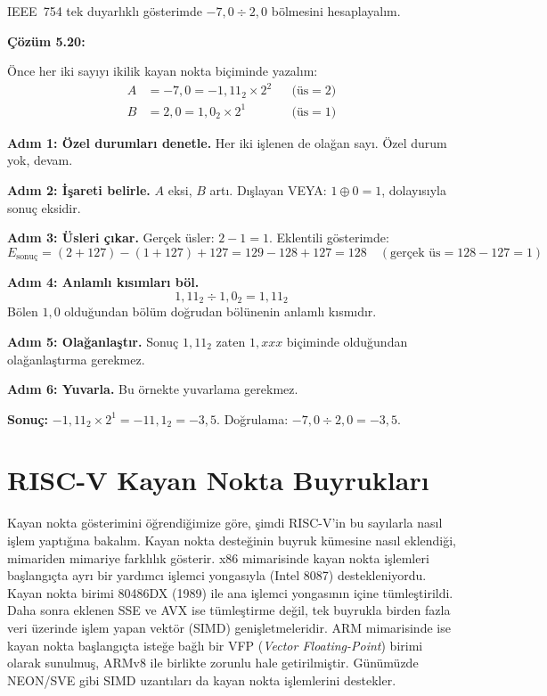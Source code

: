 \begin{ornek}[5.20]
IEEE~754 tek duyarlıklı gösterimde $-7{,}0 \div 2{,}0$ bölmesini hesaplayalım.

\textbf{Çözüm 5.20:}

Önce her iki sayıyı ikilik kayan nokta biçiminde yazalım:
\begin{align*}
A &= -7{,}0 = -1{,}11_2 \times 2^{2} &&\text{(üs} = 2\text{)} \\
B &= 2{,}0 = 1{,}0_2 \times 2^{1} &&\text{(üs} = 1\text{)}
\end{align*}

\textbf{Adım 1: Özel durumları denetle.} Her iki işlenen de olağan sayı. Özel durum yok, devam.

\textbf{Adım 2: İşareti belirle.} $A$ eksi, $B$ artı. Dışlayan VEYA: $1 \oplus 0 = 1$, dolayısıyla sonuç eksidir.

\textbf{Adım 3: Üsleri çıkar.} Gerçek üsler: $2 - 1 = 1$. Eklentili gösterimde:
\[
E_\text{sonuç} = (2 + 127) - (1 + 127) + 127 = 129 - 128 + 127 = 128 \quad (\text{gerçek üs} = 128 - 127 = 1)
\]

\textbf{Adım 4: Anlamlı kısımları böl.}
\[
1{,}11_2 \div 1{,}0_2 = 1{,}11_2
\]
Bölen $1{,}0$ olduğundan bölüm doğrudan bölünenin anlamlı kısmıdır.

\textbf{Adım 5: Olağanlaştır.} Sonuç $1{,}11_2$ zaten $1{,}xxx$ biçiminde olduğundan olağanlaştırma gerekmez.

\textbf{Adım 6: Yuvarla.} Bu örnekte yuvarlama gerekmez.

\textbf{Sonuç:} $-1{,}11_2 \times 2^{1} = -11{,}1_2 = -3{,}5$. Doğrulama: $-7{,}0 \div 2{,}0 = -3{,}5$. \checkmark
\end{ornek}

\section{RISC-V Kayan Nokta Buyrukları}
\label{sec:riscv-kayan-nokta}

Kayan nokta gösterimini öğrendiğimize göre, şimdi RISC-V'in bu sayılarla nasıl işlem yaptığına bakalım. Kayan nokta desteğinin buyruk kümesine nasıl eklendiği, mimariden mimariye farklılık gösterir. x86 mimarisinde kayan nokta işlemleri başlangıçta ayrı bir yardımcı işlemci yongasıyla (Intel 8087) destekleniyordu. Kayan nokta birimi 80486DX (1989) ile ana işlemci yongasının içine tümleştirildi. Daha sonra eklenen SSE ve AVX ise tümleştirme değil, tek buyrukla birden fazla veri üzerinde işlem yapan vektör (SIMD) genişletmeleridir. ARM mimarisinde ise kayan nokta başlangıçta isteğe bağlı bir VFP (\emph{Vector Floating-Point}) birimi olarak sunulmuş, ARMv8 ile birlikte zorunlu hale getirilmiştir. Günümüzde NEON/SVE gibi SIMD uzantıları da kayan nokta işlemlerini destekler.


